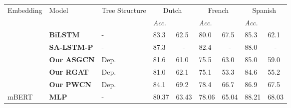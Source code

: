 \documentclass[11pt]{article}
\begin{document}
\begin{table*}[tp]
  \setlength{\tabcolsep}{0pt}\small
  \begin{tabular}{m{3cm}m{3.3cm}m{2.5cm}m{1.15cm}<{\centering}m{1.15cm}<{\centering}m{1.15cm}<{\centering}m{1.15cm}<{\centering}m{1.15cm}<{\centering}m{1.15cm}<{\centering}}
    \toprule
    \multirow{2}{*}{Embedding}        & \multirow{2}{*}{Model}        & \multirow{2}{*}{Tree Structure} & \multicolumn{2}{c}{Dutch} & \multicolumn{2}{c}{French} & \multicolumn{2}{c}{Spanish}                                                                              \\
    \cmidrule(r){4-5}\cmidrule(r){6-7}\cmidrule(r){8-9}
                                      &                               &                                 & \centering\textit{Acc.}   & \centering\textit{}   & \centering\textit{Acc.}     & \centering\textit{} & \centering\textit{Acc.} & \textit{}        \\
    \midrule\
    \multirow{5}{*}{Static Embedding} & \textbf{BiLSTM}               & -                               & 83.3                      & 62.5                       & 80.0                        & 67.5                     & 85.3                    & 62.1                  \\
                                      & \textbf{SA-LSTM-P  } & -                               & 87.3                      & \multicolumn{1}{c}{-}      & 82.4                        & \multicolumn{1}{c}{-}    & 88.0                    & \multicolumn{1}{c}{-} \\
                                      & \textbf{Our ASGCN }           & Dep.                            & 81.6                      & 61.0                       & 75.5                        & 63.0                     & 85.0                    & 59.0                  \\
                                      & \textbf{Our RGAT  }           & Dep.                            & 81.0                      & 62.1                       & 75.1                        & 53.3                     & 84.6                    & 55.2                  \\
                                      & \textbf{Our PWCN  }           & Dep.                            & 84.1                      & 69.2                       & 78.4                        & 66.7                     & 86.9                    & 67.5                  \\
    \midrule
    mBERT                             & \textbf{MLP     }             & -                               & 80.37                     & 63.43                      & 78.06                       & 65.04                    & 88.21                   & 68.03                 \\

\end{tabular}
\end{table*}
\end{document}

